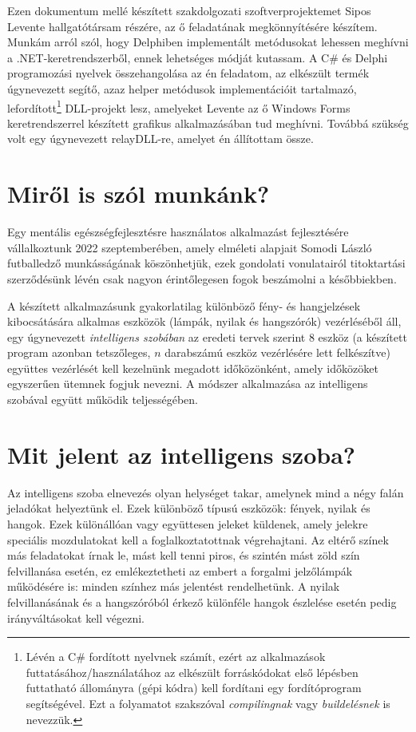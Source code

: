 \documentclass[tocnopagenum]{thesis-ekf}
\begin{document}
	Ezen dokumentum mellé készített szakdolgozati szoftverprojektemet Sipos Levente hallgatótársam részére, az ő feladatának megkönnyítésére készítem. 
	Munkám arról szól, hogy Delphiben implementált metódusokat lehessen meghívni a .NET-keretrendszerből, ennek lehetséges módját kutassam. A C\# és Delphi programozási nyelvek összehangolása az én feladatom, az elkészült termék úgynevezett segítő, azaz helper metódusok implementációit tartalmazó, lefordított\footnote{Lévén a C\# fordított nyelvnek számít, ezért az alkalmazások futtatásához/használatához az elkészült forráskódokat első lépésben futtatható állományra (gépi kódra) kell fordítani egy fordítóprogram segítségével. Ezt a folyamatot szakszóval \textit{compilingnak} vagy \textit{buildelésnek} is nevezzük.} DLL-projekt lesz, amelyeket Levente az ő Windows Forms keretrendszerrel készített grafikus alkalmazásában tud meghívni. Továbbá szükség volt egy úgynevezett relayDLL-re, amelyet én állítottam össze.
	
	\section{Miről is szól munkánk?}
	Egy mentális egészségfejlesztésre használatos alkalmazást fejlesztésére vállalkoztunk 2022 szeptemberében, amely elméleti alapjait Somodi László futballedző munkásságának köszönhetjük, ezek gondolati vonulatairól titoktartási szerződésünk lévén csak nagyon érintőlegesen fogok beszámolni a későbbiekben. 
	
	A készített alkalmazásunk gyakorlatilag különböző fény- és hangjelzések kibocsátására alkalmas eszközök (lámpák, nyilak és hangszórók) vezérléséből áll, egy úgynevezett \emph{intelligens szobában} az eredeti tervek szerint 8 eszköz (a készített program azonban tetszőleges, $n$ darabszámú eszköz vezérlésére lett felkészítve) együttes vezérlését kell kezelnünk megadott időközönként, amely időközöket egyszerűen ütemnek fogjuk nevezni.
	A módszer alkalmazása az intelligens szobával együtt működik teljességében.
	
	\section{Mit jelent az intelligens szoba?}
	Az intelligens szoba elnevezés olyan helységet takar, amelynek mind a négy falán jeladókat helyeztünk el.
	Ezek különböző típusú eszközök: fények, nyilak és hangok. 
	Ezek különállóan vagy együttesen jeleket küldenek, amely jelekre speciális mozdulatokat kell a foglalkoztatottnak végrehajtani.
	Az eltérő színek más feladatokat írnak le, mást kell tenni piros, és szintén mást zöld szín felvillanása esetén, ez emlékeztetheti az embert a forgalmi jelzőlámpák működésére is: minden színhez más jelentést rendelhetünk. A nyilak felvillanásának és a hangszóróból érkező különféle hangok észlelése esetén pedig irányváltásokat kell végezni.
	
\end{document}
